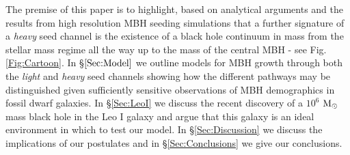 \documentclass[twocolumn, tighten]{aastex631}
\newcommand{\msolar} {$\rm{M_{\odot}}~$}
\begin{document}
The premise of this paper is to highlight, based on analytical arguments and the results from high resolution MBH seeding simulations that a further signature of a \textit{heavy} seed channel
is the existence of a black hole continuum in mass from the stellar mass regime all the way up to the mass of the central MBH - see Fig. \ref{Fig:Cartoon}.
In \S $\ref{Sec:Model}$ we outline models for MBH growth through both the \textit{light} and \textit{heavy} seed channels showing how the different pathways may be distinguished given sufficiently sensitive observations
of MBH demographics in fossil dwarf galaxies. In \S \ref{Sec:LeoI} 
we discuss the recent discovery of a $10^6$ \msolar mass black hole in the Leo I galaxy and argue that this galaxy is an ideal environment in which to test our model. 
In \S \ref{Sec:Discussion} we discuss the implications of our postulates and in \S \ref{Sec:Conclusions} we give our conclusions. 
\end{document}
